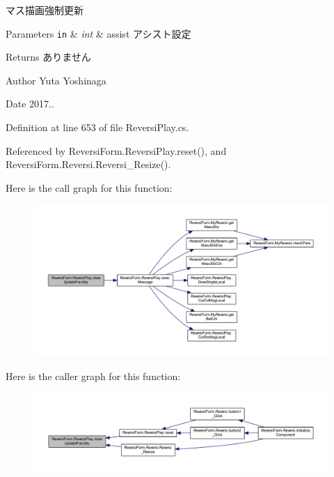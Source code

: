 マス描画強制更新 


\begin{DoxyParams}[1]{Parameters}
\mbox{\tt in}  & {\em int} & assist アシスト設定 \\
\hline
\end{DoxyParams}
\begin{DoxyReturn}{Returns}
ありません 
\end{DoxyReturn}
\begin{DoxyAuthor}{Author}
Yuta Yoshinaga 
\end{DoxyAuthor}
\begin{DoxyDate}{Date}
2017.. 
\end{DoxyDate}


Definition at line 653 of file Reversi\+Play.\+cs.



Referenced by Reversi\+Form.\+Reversi\+Play.\+reset(), and Reversi\+Form.\+Reversi.\+Reversi\+\_\+\+Resize().

Here is the call graph for this function\+:\nopagebreak
\begin{figure}[H]
\begin{center}
\leavevmode
\includegraphics[width=350pt]{class_reversi_form_1_1_reversi_play_accc1d553ba6a6c2a5f0c58316b40a183_cgraph}
\end{center}
\end{figure}
Here is the caller graph for this function\+:\nopagebreak
\begin{figure}[H]
\begin{center}
\leavevmode
\includegraphics[width=350pt]{class_reversi_form_1_1_reversi_play_accc1d553ba6a6c2a5f0c58316b40a183_icgraph}
\end{center}
\end{figure}
\mbox{\label{class_reversi_form_1_1_reversi_play_aa7cf1089065bff85997d057210312ae8}} 

